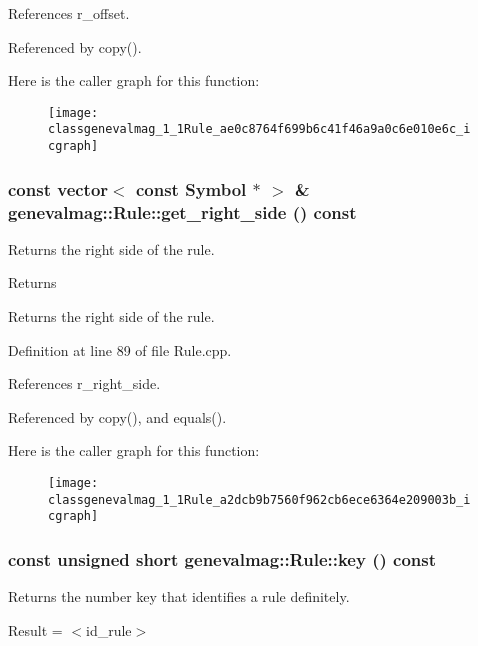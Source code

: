 References r\_\-offset.



Referenced by copy().



Here is the caller graph for this function:\nopagebreak
\begin{figure}[H]
\begin{center}
\leavevmode
\texttt{[image: classgenevalmag\_1\_1Rule\_ae0c8764f699b6c41f46a9a0c6e010e6c\_icgraph]}
\end{center}
\end{figure}


\hypertarget{classgenevalmag_1_1Rule_a2dcb9b7560f962cb6ece6364e209003b}{
\subsubsection[{get\_\-right\_\-side}]{\setlength{\rightskip}{0pt plus 5cm}const vector$<$ const {\bf Symbol} $\ast$ $>$ \& genevalmag::Rule::get\_\-right\_\-side () const}}
\label{classgenevalmag_1_1Rule_a2dcb9b7560f962cb6ece6364e209003b}
Returns the right side of the rule. \begin{DoxyReturn}{Returns}

\end{DoxyReturn}
Returns the right side of the rule. 

Definition at line 89 of file Rule.cpp.



References r\_\-right\_\-side.



Referenced by copy(), and equals().



Here is the caller graph for this function:\nopagebreak
\begin{figure}[H]
\begin{center}
\leavevmode
\texttt{[image: classgenevalmag\_1\_1Rule\_a2dcb9b7560f962cb6ece6364e209003b\_icgraph]}
\end{center}
\end{figure}


\hypertarget{classgenevalmag_1_1Rule_a3f83cca5fc997bdc3c6404eaa57a17ca}{
\subsubsection[{key}]{\setlength{\rightskip}{0pt plus 5cm}const unsigned short genevalmag::Rule::key () const}}
\label{classgenevalmag_1_1Rule_a3f83cca5fc997bdc3c6404eaa57a17ca}
Returns the number key that identifies a rule definitely.\par
 \par
 Result = $<$id\_\-rule$>$\par


